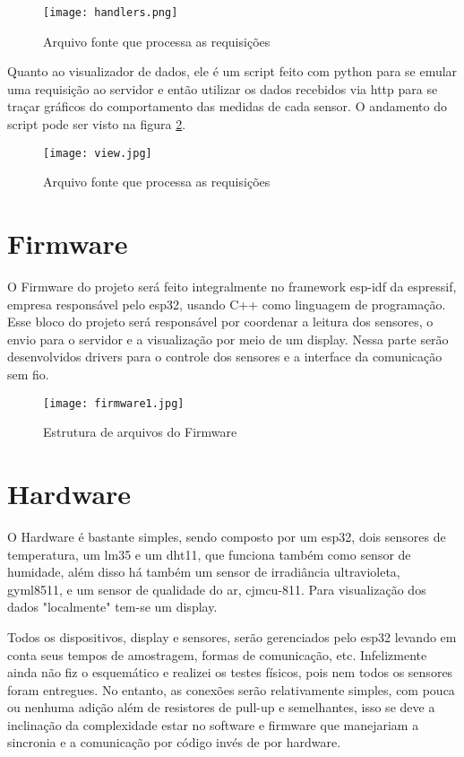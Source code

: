 \documentclass{article}
\begin{document}
\begin{figure}[ht]
	\centering
	\texttt{[image: handlers.png]}
	\caption{Arquivo fonte que processa as requisições}
	\label{fig:handler}
\end{figure}

Quanto ao visualizador de dados, ele é um script feito com python para se 
emular uma requisição ao servidor e então utilizar os dados recebidos via http
para se traçar gráficos do comportamento das medidas de cada sensor. O andamento 
do script pode ser visto na figura \ref{fig:view}.

\begin{figure}[h]
	\centering
	\texttt{[image: view.jpg]}
	\caption{Arquivo fonte que processa as requisições}
	\label{fig:view}
\end{figure}

\section{Firmware}

O Firmware do projeto será feito integralmente no framework esp-idf da espressif, empresa 
responsável pelo esp32, usando C++ como linguagem de programação. Esse bloco do projeto será
responsável por coordenar a leitura dos sensores, o envio para o servidor e a visualização por meio
de um display. Nessa parte serão desenvolvidos drivers para o controle dos sensores e a interface 
da comunicação sem fio.

\begin{figure}[h]
	\centering
	\texttt{[image: firmware1.jpg]}
	\caption{Estrutura de arquivos do Firmware}
	\label{fig:firmware}
\end{figure}

\section{Hardware}

O Hardware é bastante simples, sendo composto por um esp32, dois sensores de temperatura, um lm35
e um dht11, que funciona também como sensor de humidade, além disso há também um sensor de irradiância
ultravioleta, gyml8511, e um sensor de qualidade do ar, cjmcu-811. Para visualização dos dados "localmente" tem-se  
um display.

Todos os dispositivos, display e sensores, serão gerenciados pelo esp32 levando em conta seus tempos 
de amostragem, formas de comunicação, etc. Infelizmente ainda não fiz o esquemático e realizei os 
testes físicos, pois nem todos os sensores foram entregues. No entanto, as conexões serão relativamente
simples, com pouca ou nenhuma adição além de resistores de pull-up e semelhantes, isso se deve a inclinação
da complexidade estar no software e firmware que manejariam a sincronia e a comunicação por código invés
de por hardware.
\end{document}
